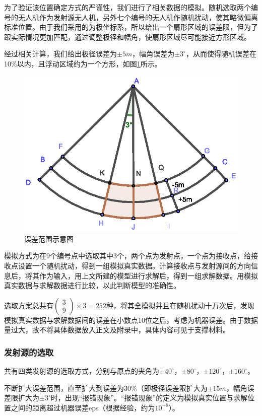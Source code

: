 \documentclass{ctexart}
\begin{document}
为了验证该位置确定方式的严谨性，我们进行了相关数据的模拟。随机选取两个编号的无人机作为发射源无人机，另外七个编号的无人机作随机扰动，使其略微偏离标准位置。由于我们采用的为极坐标系，所以给出一个扇形区域的误差限，但为了跟实际情况更加匹配，通过调整极径和幅角，使扇形区域尽可能接近方形区域。

经过相关计算，我们给出极径误差为$\pm 5m $，幅角误差为$\pm 3^{\circ}$，从而使得随机误差在10\%以内，且浮动区域约为一个方形，如图\ref{误差范围示意图}所示。

\begin{figure}[H]
  \centering
  \includegraphics[width=0.45\linewidth]{pic/error area.eps}
  \caption{误差范围示意图}
  \label{误差范围示意图}
  \end{figure}

模拟方式为在9个编号点中选取其中3个，两个点为发射点，一个点为接收点，给接收点设置一个随机扰动，得到一组模拟真实数据。计算接收点与发射源间的方向信息后，将其作为输入，用上文所建的模型进行求解后，得到一组求解数据。用模拟真实数据与求解数据进行比较，以此判断模型的准确性。

选取方案总共有$\begin{pmatrix} 3 \\ 9 \end{pmatrix}\times 3=252$种，将其全模拟并且在随机扰动十万次后，发现模拟真实数据与求解数据间的误差在小数点10位之后，考虑为机器误差。由于数据量过大，故不将具体数据放入正文及附录中，具体内容可见于支撑材料。

\subsubsection{发射源的选取}

共有四类发射源的选取方式，分别与原点的夹角为$\pm 40^{\circ}$，$\pm 80^{\circ}$，$\pm 120^{\circ}$，$\pm 160^{\circ}$。

不断扩大误差范围，直至扩大到误差为30\%（即极径误差限扩大为$\pm 15m$，幅角误差限扩大为$\pm 3^{\circ}$时，出现“报错现象”。“报错现象”的定义为模拟真实位置与求解位置之间的距离超过机器误差eps（根据经验，约为$10^{-8}$）。
\end{document}
